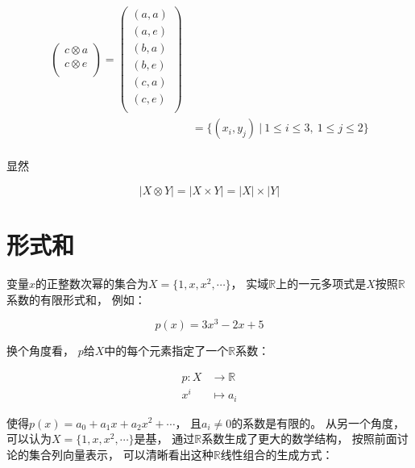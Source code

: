 \documentclass[10pt, openany]{book}
\begin{document}
\begin{equation}
\begin{aligned}
\begin{pmatrix}
    c \otimes a \\ c \otimes e \\\end{pmatrix} 
=\begin{pmatrix}(a,a) \\ (a,e) \\
    (b,a) \\ (b,e) \\
    (c,a) \\ (c,e) \\\end{pmatrix} \\
&= \{ (x_i,y_j) \ | \ 1 \leq i \leq 3,\ 1 \leq j \leq 2 \} \\
\end{aligned}
\end{equation}\label{eq:set-tensor}

显然

$$
|X \otimes Y| = |X \times Y| = |X| \times |Y|
$$

\section{形式和}

变量$x$的正整数次幂的集合为$X = \{1,x,x^2,\cdots\}$，
实域$\mathbb R$上的一元多项式是$X$按照$\mathbb R$系数的有限形式和，
例如：

$$
p(x) = 3x^3 - 2x + 5
$$

换个角度看，
$p$给$X$中的每个元素指定了一个$\mathbb R$系数：

$$
\begin{aligned}
p: X &\to \mathbb R \\
x^i &\mapsto a_i
\end{aligned}
$$

使得$p(x) = a_0 + a_1 x + a_2 x^2 + \cdots$，
且$a_i \neq 0$的系数是有限的。
从另一个角度，
可以认为$X = \{1,x,x^2,\cdots\}$是基，
通过$\mathbb R$系数生成了更大的数学结构，
按照前面讨论的集合列向量表示，
可以清晰看出这种$\mathbb R$线性组合的生成方式：
\end{document}
